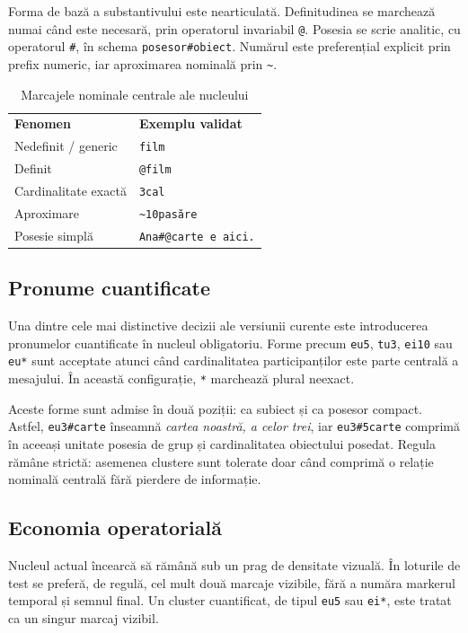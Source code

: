 \documentclass[12pt,onecolumn,letterpaper]{article}
\newcommand{\rs}[1]{\texttt{#1}}
\newcommand{\RStablelayout}{%
\footnotesize
\setlength{\tabcolsep}{6pt}%
\renewcommand{\arraystretch}{1.12}%
\arrayrulecolor{RSRule}%
}
\begin{document}
Forma de bază a substantivului este nearticulată. Definitudinea se marchează
numai când este necesară, prin operatorul invariabil \rs{@}. Posesia se scrie
analitic, cu operatorul \rs{\#}, în schema \rs{posesor\#obiect}. Numărul este
preferențial explicit prin prefix numeric, iar aproximarea nominală prin
\rs{\textasciitilde{}}.

\begin{table}[h!]
\centering
\RStablelayout
\begin{tabularx}{\linewidth}{@{}lY@{}}
\textbf{Fenomen} & \textbf{Exemplu validat} \\
Nedefinit / generic & \rs{film} \\
Definit & \rs{@film} \\
Cardinalitate exactă & \rs{3cal} \\
Aproximare & \rs{\textasciitilde10pasăre} \\
Posesie simplă & \rs{Ana\#@carte e aici.} \\
\bottomrule
\end{tabularx}
\caption{Marcajele nominale centrale ale nucleului}
\end{table}

\subsection{Pronume cuantificate}

Una dintre cele mai distinctive decizii ale versiunii curente este introducerea
pronumelor cuantificate în nucleul obligatoriu. Forme precum \rs{eu5}, \rs{tu3},
\rs{ei10} sau \rs{eu*} sunt acceptate atunci când cardinalitatea
participanților este parte centrală a mesajului. În această configurație,
\rs{*} marchează plural neexact.

Aceste forme sunt admise în două poziții: ca subiect și ca posesor compact.
Astfel, \rs{eu3\#carte} înseamnă \textit{cartea noastră, a celor trei}, iar
\rs{eu3\#5carte} comprimă în aceeași unitate posesia de grup și cardinalitatea
obiectului posedat. Regula rămâne strictă: asemenea clustere sunt tolerate doar
când comprimă o relație nominală centrală fără pierdere de informație.

\subsection{Economia operatorială}

Nucleul actual încearcă să rămână sub un prag de densitate vizuală. În loturile
de test se preferă, de regulă, cel mult două marcaje vizibile, fără a număra
markerul temporal și semnul final. Un cluster cuantificat, de tipul \rs{eu5} sau
\rs{ei*}, este tratat ca un singur marcaj vizibil.
\end{document}
